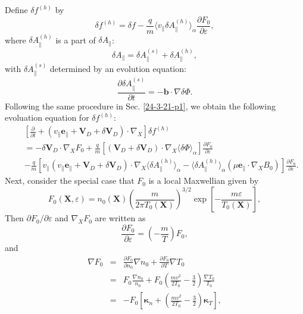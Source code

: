 \documentclass{article}
\newcommand{\tmmathbf}[1]{\ensuremath{\boldsymbol{#1}}}
\begin{document}
Define $\delta f^{(h)}$ by
\begin{equation}
  \label{23-11-16-p1} \delta f^{(h)} = \delta f - \frac{q}{m} \langle
  v_{\parallel} \delta A_{\parallel}^{(h)} \rangle_{\alpha} \frac{\partial
  F_0}{\partial \varepsilon},
\end{equation}
where $\delta A_{\parallel}^{(h)}$ is a part of $\delta A_{\parallel}$:
\begin{equation}
  \delta A_{\parallel} = \delta A_{\parallel}^{(s)} + \delta
  A_{\parallel}^{(h)},
\end{equation}
with $\delta A_{\parallel}^{(s)}$ determined by an evolution equation:
\begin{equation}
  \label{23-11-16-2} \frac{\partial \delta A_{\parallel}^{(s)}}{\partial t} =
  -\mathbf{b} \cdot \nabla \delta \Phi .
\end{equation}
Following the same procedure in Sec. \ref{24-3-21-p1}, we obtain the following
evoluation equation for $\delta f^{(h)}$:
\begin{eqnarray}
  &  & \left[ \frac{\partial}{\partial t} + (v_{\parallel}
  \mathbf{e}_{\parallel} +\mathbf{V}_D + \delta \mathbf{V}_D) \cdot \nabla_X
  \right] \delta f^{(h)} \nonumber\\
  &  & = - \delta \mathbf{V}_D \cdot \nabla_X F_0 + \frac{q}{m}
  [(\mathbf{V}_D + \delta \mathbf{V}_D) \cdot \nabla_X \langle \delta \Phi
  \rangle_{\alpha}] \frac{\partial F_0}{\partial \varepsilon} \nonumber\\
  &  & - \frac{q}{m} [v_{\parallel} (v_{\parallel} \mathbf{e}_{\parallel}
  +\mathbf{V}_D + \delta \mathbf{V}_D) \cdot \nabla_X \langle \delta
  A_{\parallel}^{(h)} \rangle_{\alpha} - \langle \delta A_{\parallel}^{(h)}
  \rangle_{\alpha} (\mu \mathbf{e}_{\parallel} \cdot \nabla_X B_0)]
  \frac{\partial F_0}{\partial \varepsilon} .  \label{17-6-21-3}
\end{eqnarray}
Next, consider the special case that $F_0$ is a local Maxwellian given by
\begin{equation}
  F_0 (\mathbf{X}, \varepsilon) = n_0 (\mathbf{X}) \left( \frac{m}{2 \pi T_0
  (\mathbf{X})} \right)^{3 / 2} \exp \left[ - \frac{m \varepsilon}{T_0
  (\mathbf{X})} \right],
\end{equation}
Then $\partial F_0 / \partial \varepsilon$ and $\nabla_X F_0$ are written as
\begin{equation}
  \label{17-7-16-1} \frac{\partial F_0}{\partial \varepsilon} = \left( -
  \frac{m}{T} \right) F_0,
\end{equation}
and
\begin{eqnarray}
  \nabla F_0 & = & \frac{\partial F_0}{\partial n_0} \nabla n_0 +
  \frac{\partial F_0}{\partial T} \nabla T_0 \nonumber\\
  & = & F_0 \frac{\nabla n_0}{n_0} + F_0 \left( \frac{m v^2}{2 T_0} -
  \frac{3}{2} \right) \frac{\nabla T_0}{T_0} \nonumber\\
  & = & - F_0 \left[ \tmmathbf{\kappa}_n + \left( \frac{m v^2}{2 T_0} -
  \frac{3}{2} \right) \tmmathbf{\kappa}_T \right],  \label{17-7-16-2}
\end{eqnarray}
\end{document}
